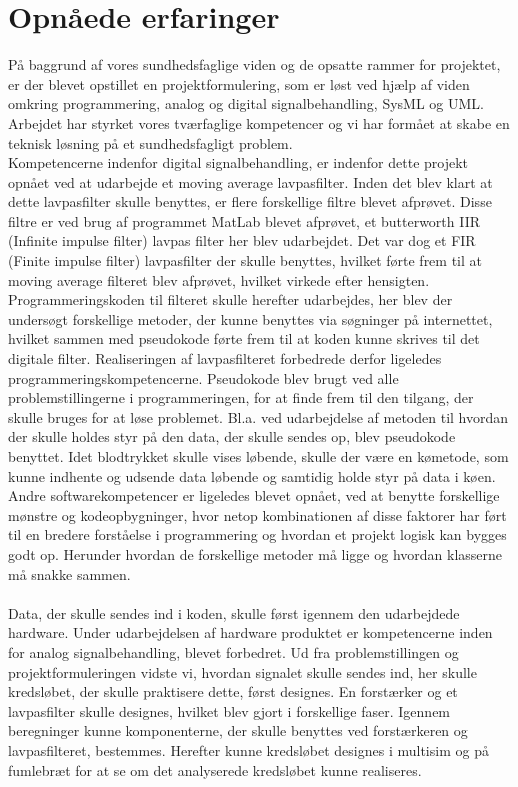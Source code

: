 \section{Opnåede erfaringer}
På baggrund af vores sundhedsfaglige viden og de opsatte rammer for projektet, er der blevet opstillet en projektformulering, som er løst ved hjælp af viden omkring programmering, analog og digital signalbehandling, SysML og UML. Arbejdet har styrket vores tværfaglige kompetencer og vi har formået at skabe en teknisk løsning på et sundhedsfagligt problem.\\
Kompetencerne indenfor digital signalbehandling, er indenfor dette projekt opnået ved at udarbejde et moving average lavpasfilter. Inden det blev klart at dette lavpasfilter skulle benyttes, er flere forskellige filtre blevet afprøvet. Disse filtre er ved brug af programmet MatLab blevet afprøvet, et butterworth IIR (Infinite impulse filter) lavpas filter her blev udarbejdet. Det var dog et FIR (Finite impulse filter) lavpasfilter der skulle benyttes, hvilket førte frem til at moving average filteret blev afprøvet, hvilket virkede efter hensigten. \\
Programmeringskoden til filteret skulle herefter udarbejdes, her blev der undersøgt forskellige metoder, der kunne benyttes via søgninger på internettet, hvilket sammen med pseudokode førte frem til at koden kunne skrives til det digitale filter. Realiseringen af lavpasfilteret forbedrede derfor ligeledes programmeringskompetencerne. Pseudokode blev brugt ved alle problemstillingerne i programmeringen, for at finde frem til den tilgang, der skulle bruges for at løse problemet. Bl.a. ved udarbejdelse af metoden til hvordan der skulle holdes styr på den data, der skulle sendes op, blev pseudokode benyttet. Idet blodtrykket skulle vises løbende, skulle der være en kømetode, som kunne indhente og udsende data løbende og samtidig holde styr på data i køen.\\
Andre softwarekompetencer er ligeledes blevet opnået, ved at benytte forskellige mønstre og kodeopbygninger, hvor netop kombinationen af disse faktorer har ført til en bredere forståelse i programmering og hvordan et projekt logisk kan bygges godt op. Herunder hvordan de forskellige metoder må ligge og hvordan klasserne må snakke sammen. \\\\
Data, der skulle sendes ind i koden, skulle først igennem den udarbejdede hardware. Under udarbejdelsen af hardware produktet er kompetencerne inden for analog signalbehandling, blevet forbedret. Ud fra problemstillingen og projektformuleringen vidste vi, hvordan signalet skulle sendes ind, her skulle kredsløbet, der skulle praktisere dette, først designes. En forstærker og et lavpasfilter skulle designes, hvilket blev gjort i forskellige faser. Igennem beregninger kunne komponenterne, der skulle benyttes ved forstærkeren og lavpasfilteret, bestemmes. Herefter kunne kredsløbet designes i multisim og på fumlebræt for at se om det analyserede kredsløbet kunne realiseres. \\\\
